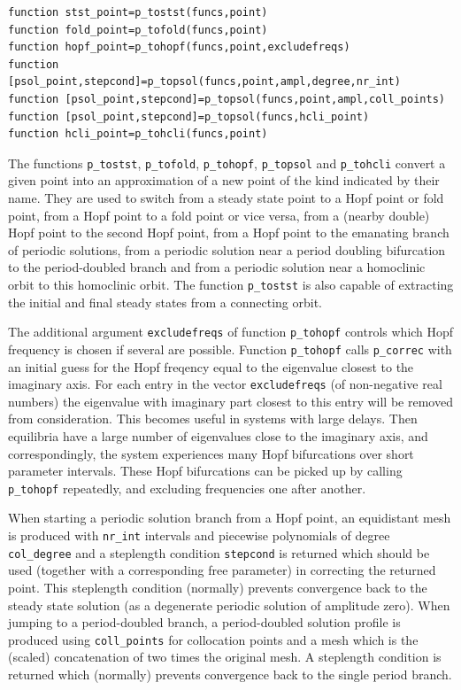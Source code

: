 \documentclass[10pt]{scrartcl}
\newcommand{\blist}[1]{\mbox{\lstinline!#1!}}
\begin{document}
{\begin{lstlisting}
function stst_point=p_tostst(funcs,point)
function fold_point=p_tofold(funcs,point)
function hopf_point=p_tohopf(funcs,point,excludefreqs)
function [psol_point,stepcond]=p_topsol(funcs,point,ampl,degree,nr_int)
function [psol_point,stepcond]=p_topsol(funcs,point,ampl,coll_points)
function [psol_point,stepcond]=p_topsol(funcs,hcli_point)
function hcli_point=p_tohcli(funcs,point)  
\end{lstlisting}
\noindent The functions \blist{p_tostst}, \blist{p_tofold},
\blist{p_tohopf}, \blist{p_topsol} and \blist{p_tohcli} convert a
given point into an approximation of a new point of the kind indicated
by their name. They are used to switch from a steady state point to a
Hopf point or fold point, from a Hopf point to a fold point or vice
versa, from a (nearby double) Hopf point to the second Hopf point,
from a Hopf point to the emanating branch of periodic solutions, from
a periodic solution near a period doubling bifurcation to the
period-doubled branch and from a periodic solution near a homoclinic
orbit to this homoclinic orbit.  The function \blist{p_tostst} is also
capable of extracting the initial and final steady states from a
connecting orbit. 

The additional argument \blist{excludefreqs} of function
\blist{p_tohopf} controls which Hopf frequency is chosen if several
are possible. Function \blist{p_tohopf} calls \blist{p_correc} with an
initial guess for the Hopf freqency equal to the eigenvalue closest to
the imaginary axis. For each entry in the vector \blist{excludefreqs}
(of non-negative real numbers) the eigenvalue with imaginary part
closest to this entry will be removed from consideration. This becomes
useful in systems with large delays. Then equilibria have a large
number of eigenvalues close to the imaginary axis, and
correspondingly, the system experiences many Hopf bifurcations over
short parameter intervals. These Hopf bifurcations can be picked up by
calling \blist{p_tohopf} repeatedly, and excluding frequencies one
after another.

When starting a periodic solution branch from a Hopf point, an
equidistant mesh is produced with \blist{nr_int} intervals and
piecewise polynomials of degree \blist{col_degree} and a steplength
condition \blist{stepcond} is returned which should be used (together
with a corresponding free parameter) in correcting the returned
point. This steplength condition (normally) prevents convergence back
to the steady state solution (as a degenerate periodic solution of
amplitude zero). When jumping to a period-doubled branch, a
period-doubled solution profile is produced using \blist{coll_points}
for collocation points and a mesh which is the (scaled) concatenation
of two times the original mesh.  A steplength condition is returned
which (normally) prevents convergence back to the single period
branch.

}
\end{document}
